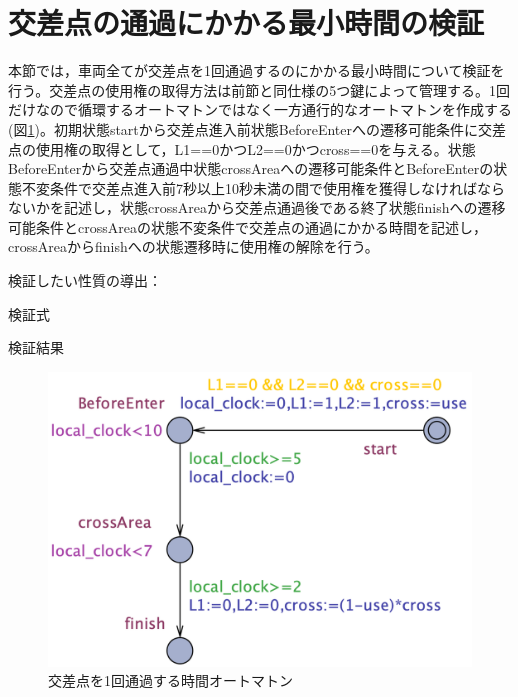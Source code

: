 \documentclass{tpu-sotu}
\begin{document}
	\section{交差点の通過にかかる最小時間の検証}
	本節では，車両全てが交差点を1回通過するのにかかる最小時間について検証を行う。交差点の使用権の取得方法は前節と同仕様の5つ鍵によって管理する。1回だけなので循環するオートマトンではなく一方通行的なオートマトンを作成する(図\ref{minT})。初期状態startから交差点進入前状態BeforeEnterへの遷移可能条件に交差点の使用権の取得として，L1==0かつL2==0かつcross==0を与える。状態BeforeEnterから交差点通過中状態crossAreaへの遷移可能条件とBeforeEnterの状態不変条件で交差点進入前7秒以上10秒未満の間で使用権を獲得しなければならないかを記述し，状態crossAreaから交差点通過後である終了状態finishへの遷移可能条件とcrossAreaの状態不変条件で交差点の通過にかかる時間を記述し，crossAreaからfinishへの状態遷移時に使用権の解除を行う。
	
	検証したい性質の導出：
	
	検証式
	
	検証結果
	\begin{figure}[htbp]
	\centering
	\includegraphics[width=130mm]{minTime.png}
	\caption{交差点を1回通過する時間オートマトン}
	\label{minT}
	\end{figure}
\end{document}
